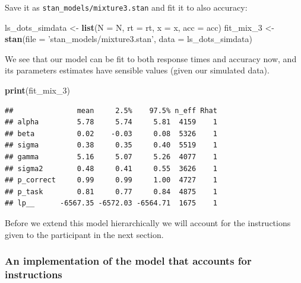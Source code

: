 \documentclass[12pt,]{krantz}
\newenvironment{Shaded}{\begin{snugshade}}{\end{snugshade}}
\newcommand{\DataTypeTok}[1]{\textcolor[rgb]{0.13,0.29,0.53}{#1}}
\newcommand{\DecValTok}[1]{\textcolor[rgb]{0.00,0.00,0.81}{#1}}
\newcommand{\KeywordTok}[1]{\textcolor[rgb]{0.13,0.29,0.53}{\textbf{#1}}}
\newcommand{\NormalTok}[1]{#1}
\newcommand{\StringTok}[1]{\textcolor[rgb]{0.31,0.60,0.02}{#1}}
\theoremstyle{definition}
\theoremstyle{definition}
\theoremstyle{definition}
\theoremstyle{remark}
\begin{document}
Save it as \texttt{stan\_models/mixture3.stan} and fit it to also accuracy:

\begin{Shaded}
\begin{Highlighting}[]
\NormalTok{ls_dots_simdata <-}\StringTok{ }\KeywordTok{list}\NormalTok{(}\DataTypeTok{N =}\NormalTok{ N,}
                        \DataTypeTok{rt =}\NormalTok{ rt,}
                        \DataTypeTok{x =}\NormalTok{ x,}
                        \DataTypeTok{acc =}\NormalTok{ acc)}
\NormalTok{fit_mix_}\DecValTok{3}\NormalTok{ <-}\StringTok{ }\KeywordTok{stan}\NormalTok{(}\DataTypeTok{file =} \StringTok{'stan_models/mixture3.stan'}\NormalTok{,}
               \DataTypeTok{data =}\NormalTok{ ls_dots_simdata) }
\end{Highlighting}
\end{Shaded}

We see that our model can be fit to both response times and accuracy now, and its parameters estimates have sensible values (given our simulated data).

\begin{Shaded}
\begin{Highlighting}[]
\KeywordTok{print}\NormalTok{(fit_mix_}\DecValTok{3}\NormalTok{)}
\end{Highlighting}
\end{Shaded}

\begin{verbatim}
##               mean     2.5%    97.5% n_eff Rhat
## alpha         5.78     5.74     5.81  4159    1
## beta          0.02    -0.03     0.08  5326    1
## sigma         0.38     0.35     0.40  5519    1
## gamma         5.16     5.07     5.26  4077    1
## sigma2        0.48     0.41     0.55  3626    1
## p_correct     0.99     0.99     1.00  4727    1
## p_task        0.81     0.77     0.84  4875    1
## lp__      -6567.35 -6572.03 -6564.71  1675    1
\end{verbatim}

Before we extend this model hierarchically we will account for the instructions given to the participant in the next section.

\hypertarget{an-implementation-of-the-model-that-accounts-for-instructions}{%
\subsubsection{An implementation of the model that accounts for instructions}\label{an-implementation-of-the-model-that-accounts-for-instructions}}
\end{document}
